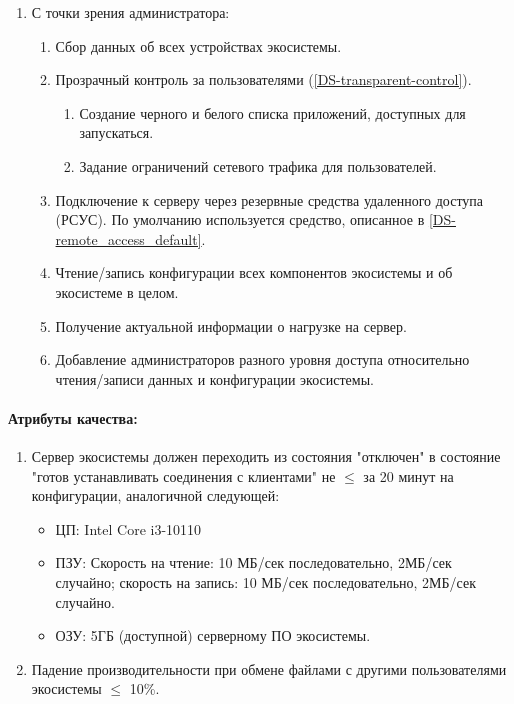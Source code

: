 \begin{enumerate}[label={\bfseries ПТ-\arabic*.}]
   \item С точки зрения администратора:
         \begin{enumerate}[nosep,label*={\bfseries\arabic*.}]
            \item Сбор данных об всех устройствах экосистемы.
            \item Прозрачный контроль за пользователями (\ref{DS-transparent-control}).
                  \begin{enumerate}[nosep,label*={\bfseries\arabic*.}]
                     \item Создание черного и белого списка приложений, доступных для запускаться.
                     \item Задание ограничений сетевого трафика для пользователей.
                  \end{enumerate}
            \item Подключение к серверу через резервные средства удаленного доступа (РСУС). По умолчанию используется средство, описанное в \ref{DS-remote_access_default}.
            \item Чтение/запись конфигурации всех компонентов экосистемы и об экосистеме в целом.
            \item Получение актуальной информации о нагрузке на сервер.
            \item Добавление администраторов разного уровня доступа относительно чтения/записи данных и конфигурации экосистемы.
         \end{enumerate}
\end{enumerate}

\paragraph*{Атрибуты качества:}
\begin{enumerate}[label={\bfseries АК-\arabic*.}]
   \item Сервер экосистемы должен переходить из состояния "отключен" в состояние "готов устанавливать соединения с клиентами" не \(\leq\) за 20 минут на конфигурации, аналогичной следующей:
         \begin{itemize}
            \item ЦП: Intel Core i3-10110
            \item ПЗУ: Скорость на чтение: 10 МБ/сек последовательно, 2МБ/сек случайно; скорость на запись: 10 МБ/сек последовательно, 2МБ/сек случайно.
            \item ОЗУ: 5ГБ (доступной) серверному ПО экосистемы.
         \end{itemize}
   \item Падение производительности при обмене файлами с другими пользователями экосистемы \(\leq\) 10\%.
\end{enumerate}

